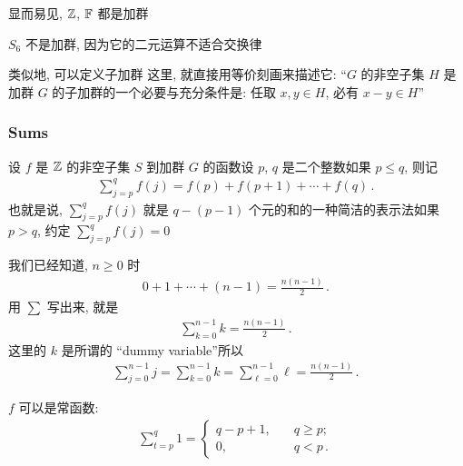 \begin{example}
    显而易见, $\mathbb{Z}$, $\mathbb{F}$ 都是加群\period
\end{example}

\begin{example}
    $S_6$ 不是加群, 因为它的二元运算不适合交换律\period
\end{example}

\begin{remark}
    类似地, 可以定义子加群 \period 这里, 就直接用等价刻画来描述它: ``$G$ 的非空子集 $H$ 是加群 $G$ 的子加群的一个必要与充分条件是: 任取 $x,y \in H$, 必有 $x-y \in H$\period ''
\end{remark}

\subsubsection*{Sums}

\begin{definition}
    设 $f$ 是 $\mathbb{Z}$ 的非空子集 $S$ 到加群 $G$ 的函数\period 设 $p$, $q$ 是二个整数\period 如果 $p \leq q$, 则记
    \begin{align*}
        \sum_{j = p}^{q} f(j) = f(p) + f(p + 1) + \cdots + f(q)\period
    \end{align*}
    也就是说, $\sum_{j = p}^{q} f(j)$ 就是 $q - (p - 1)$ 个元的和的一种简洁的表示法\period 如果 $p > q$, 约定 $\sum_{j = p}^{q} f(j) = 0$\period
\end{definition}

\begin{example}
    我们已经知道, $n \geq 0$ 时
    \begin{align*}
        0 + 1 + \cdots + (n-1) = \frac{n(n-1)}{2}\period
    \end{align*}
    用 $\sum$ 写出来, 就是
    \begin{align*}
        \sum_{k=0}^{n-1} k = \frac{n(n-1)}{2}\period
    \end{align*}
    这里的 $k$ 是所谓的 ``dummy variable''\period 所以
    \begin{align*}
        \sum_{j=0}^{n-1} j = \sum_{k=0}^{n-1} k = \sum_{\ell=0}^{n-1} \ell = \frac{n(n-1)}{2}\period
    \end{align*}
\end{example}

\begin{example}
    $f$ 可以是常函数:
    \begin{align*}
        \sum_{t=p}^{q} 1 = \begin{cases}
            q - p + 1, & \quad q \geq p;     \\
            0,         & \quad q < p \period
        \end{cases}
    \end{align*}
\end{example}

